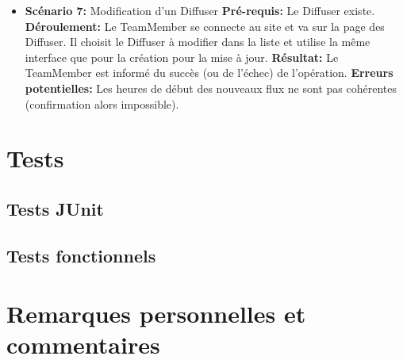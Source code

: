 \documentclass[french]{article}
\begin{document}
\begin{itemize}
			\item \textbf{Scénario 7:} Modification d'un Diffuser \newline
			\textbf{Pré-requis:} Le Diffuser existe.\newline
			\textbf{Déroulement:} Le TeamMember se connecte au site et va sur la page des Diffuser. Il choisit le Diffuser à modifier dans la liste et utilise la même interface que pour la création pour la mise à jour. \newline
			\textbf{Résultat:} Le TeamMember est informé du succès (ou de l'échec) de l'opération.\newline
			\textbf{Erreurs potentielles:} Les heures de début des nouveaux flux ne sont pas cohérentes (confirmation alors impossible). \newline

		\end{itemize}
	
\section{Tests}

\subsection{Tests JUnit}

\subsection{Tests fonctionnels}

\section{Remarques personnelles et commentaires}
\end{document}
